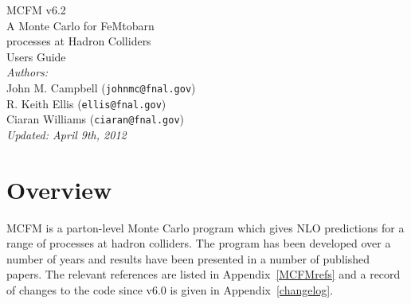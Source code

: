 \documentclass[12pt]{article}
\begin{document}
\def\GeV{\mbox{GeV}}
\def\cteqten{\mbox{1007.2241 [hep-ph]}}
\def\cteqsixsixm{\mbox{0802.0007 [hep-ph]}}
\def\cteqsixonem{\mbox{hep-ph/0303013}}
\def\cteqsix{\mbox{hep-ph/0201195}}
\def\cteqfive{\mbox{hep-ph/9903282}}
\def\cteqfour{\mbox{hep-ph/9606399}}
\def\cteqthree{\mbox{MSU-HEP/41024}}
\def\mrstff{\mbox{hep-ph/0603143}}
\def\mrstohtwo{\mbox{hep-ph/0211080}}
\def\mrstohtwofirst{\mbox{hep-ph/0201127}}
\def\mrstohone{\mbox{hep-ph/0110215}}
\def\mrsninenine{\mbox{hep-ph/9907231}}
\def\mrsnineeight{\mbox{hep-ph/9803445}}
\def\mrsninesix{\mbox{PLB387 (1996) 419}}
\def\mrsninefive{\mbox{PLB354 (1995) 155}}
\def\hmrs{\mbox{Durham DTP-90-04}}
\def\mstwoheight{\mbox{0901.0002 [hep-ph]}}
\def\pow{{\lower.12ex\hbox{\texttt{\char`\^}}}}

\thispagestyle{empty}
\vspace*{3cm}
\begin{center}
{\Huge MCFM v6.2} \\
\vspace*{0.5cm}
\Large{A Monte Carlo for FeMtobarn} \\
\Large{processes at Hadron Colliders} \\
\vspace*{2cm}
{\huge Users Guide} \\
\vspace*{4cm}
{\it Authors:} \\
\vspace*{0.2cm}
John M. Campbell ({\tt johnmc@fnal.gov}) \\
R. Keith Ellis ({\tt ellis@fnal.gov}) \\
Ciaran Williams ({\tt ciaran@fnal.gov}) \\
\vspace*{2cm}
{\it \small Updated: April 9th, 2012}
\end{center}

\newpage

\tableofcontents

\section{Overview}

MCFM is a parton-level Monte Carlo program which gives NLO predictions
for a range of processes at hadron colliders. The program has been
developed over a number of years and results have been presented in
a number of published papers. The relevant references are listed
in Appendix~\ref{MCFMrefs} and a record of changes to the code
since v6.0 is given in Appendix~\ref{changelog}.
\end{document}
